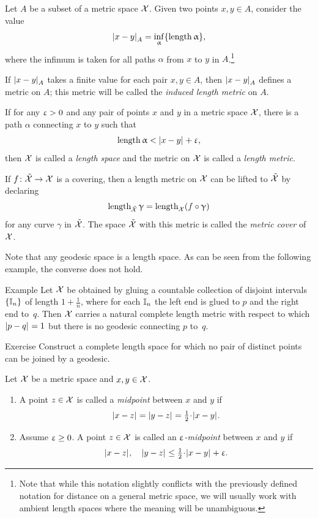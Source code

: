 Let $A$ be a subset of a metric space $\mathcal{X}$.
Given two points $x,y\in A$,
consider the value
\[\dist{x}{y}{A}=\inf_{\alpha}\{\length\alpha\},\]
where the infimum is taken for all paths $\alpha$ from $x$ to $y$ in $A$.\footnote{Note that while this notation slightly conflicts with the previously defined notation for distance on a general metric space, we will usually work with ambient length spaces where the meaning will be unambiguous.}

If $\dist{x}{y}{A}$ takes a finite value for each pair $x,y\in A$,
then $\dist{x}{y}{A}$ defines a metric on  $A$;
this metric will be called the \emph{induced length metric} on $A$.

If for any $\upvarepsilon>0$ and any pair of points $x$ and $y$ in a metric space $\mathcal{X}$, there is a path $\alpha$ connecting $x$ to $y$ such that
\[\length\alpha< \dist{x}{y}{}+\eps,\]
then $\mathcal{X}$ is called a \emph{length space} and the metric on $\mathcal{X}$ is called a \emph{length metric}.\label{page:length metric}

If $f\:\tilde{\spc{X}}\to\spc{X}$ is a covering,
then a length metric on $\mathcal{X}$ can be lifted to $\tilde{\mathcal{X}}$
by declaring 
\[\length_{\tilde{\spc{X}}}\gamma=\length_{\spc{X}}(f\circ\gamma)\]
for any curve $\gamma$ in $\tilde{\mathcal{X}}$.
The space $\tilde{\mathcal{X}}$ with this metric is called the  \emph{metric cover} of $\mathcal{X}$.

Note that any geodesic space is a length space.
As can be seen from the following example, the converse does not hold.


\begin{thm}{Example}
Let $\mathcal{X}$ be obtained by gluing a countable collection of disjoint intervals $\{\mathbb{I}_n\}$ of length $1+\tfrac1n$, where for each $\mathbb{I}_n$ the left end is glued to $p$ and the right end to~$q$.
Then $\mathcal{X}$ carries a natural complete length metric with respect to which $\dist{p}{q}{}=1$ but there is no geodesic connecting $p$ to~$q$.
\end{thm}



\begin{thm}{Exercise}\label{ex:no-geod}
Construct a complete length space for which no pair of distinct points can be joined by a geodesic.
\end{thm}

Let $\mathcal{X}$ be a metric space and $x,y\in\spc{X}$.

\begin{enumerate}
\renewcommand\labelenumi{(\roman{enumi})}
\item A point $z\in \spc{X}$ is called a \emph{midpoint} between $x$ and $y$
if 
\[\dist{x}{z}{}=\dist{y}{z}{}=\tfrac12\cdot\dist[{{}}]{x}{y}{}.\]
\item Assume $\eps\ge 0$.
A point $z\in \spc{X}$ is called an {}\emph{$\upvarepsilon$-midpoint} between $x$ and $y$
if 
\[\dist{x}{z}{},\quad\dist{y}{z}{}\le\tfrac12\cdot\dist[{{}}]{x}{y}{}+\eps.\]
\end{enumerate}


